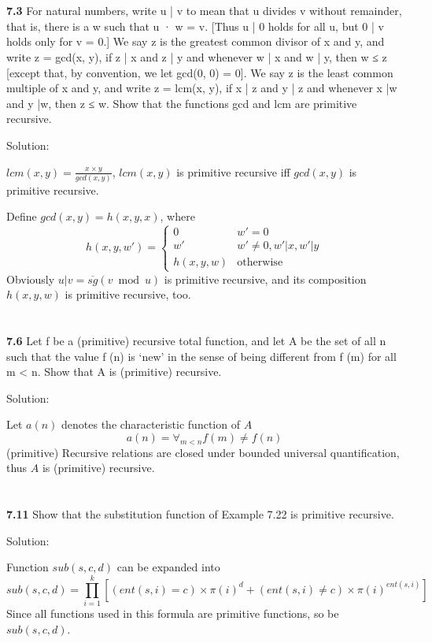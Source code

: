 \documentclass{ctexart}
\begin{document}
\section*{}

\textbf{7.3} For natural numbers, write u | v to mean that u divides v without remainder,
that is, there is a w such that u · w = v. [Thus u | 0 holds for all u, but 0 | v
holds only for v = 0.] We say z is the greatest common divisor of x and y, and
write z = gcd(x, y), if z | x and z | y and whenever w | x and w | y, then w ≤ z
[except that, by convention, we let gcd(0, 0) = 0]. We say z is the least common
multiple of x and y, and write z = lcm(x, y), if x | z and y | z and whenever
x |w and y |w, then z ≤ w. Show that the functions gcd and lcm are primitive
recursive.

Solution:

$lcm(x, y) = \frac{x \times y}{gcd(x, y)}$, $lcm(x, y)$ is primitive recursive iff
$gcd(x, y)$ is primitive recursive.

Define $gcd(x, y) = h(x, y, x)$, where
$$
h(x, y, w') = \begin{cases}
0 & w' = 0 \\
w' & w' \ne 0, w' | x, w' | y \\
h(x, y, w) & \mathrm{otherwise}
\end{cases}
$$
Obviously $u | v = \overline{sg}(v \bmod u)$ is primitive recursive,
and its composition $h(x, y, w)$ is primitive recursive, too.

\section*{}

\textbf{7.6} Let f be a (primitive) recursive total function, and let A be the set of all n such
that the value f (n) is ‘new’ in the sense of being different from f (m) for all
m < n. Show that A is (primitive) recursive.

Solution:

Let $a(n)$ denotes the characteristic function of $A$
$$
a(n) = \forall_{m < n} f(m) \ne f(n)
$$
(primitive) Recursive relations are closed under bounded universal quantification, thus $A$ is
(primitive) recursive.

\section*{}

\textbf{7.11} Show that the substitution function of Example 7.22 is primitive recursive.

Solution:

Function $sub(s, c, d)$ can be expanded into
$$
sub(s, c, d) = \prod_{i=1}^{k} \left[
	\left(ent(s, i) = c \right) \times \pi(i)^d
	+
	\left(ent(s, i) \ne c \right) \times \pi(i)^{ent(s, i)}
	\right]
$$
Since all functions used in this formula are primitive functions, so be $sub(s, c, d)$.
\end{document}
